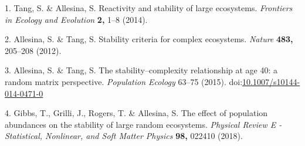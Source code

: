 \documentclass[]{article}
\begin{document}
\hypertarget{refs}{}
\leavevmode\hypertarget{ref-Tang2014b}{}%
1. Tang, S. \& Allesina, S. Reactivity and stability of large
ecosystems. \emph{Frontiers in Ecology and Evolution} \textbf{2,} 1--8
(2014).

\leavevmode\hypertarget{ref-Allesina2012}{}%
2. Allesina, S. \& Tang, S. Stability criteria for complex ecosystems.
\emph{Nature} \textbf{483,} 205--208 (2012).

\leavevmode\hypertarget{ref-Allesina2015a}{}%
3. Allesina, S. \& Tang, S. The stability--complexity relationship at
age 40: a random matrix perspective. \emph{Population Ecology} 63--75
(2015).
doi:\href{https://doi.org/10.1007/s10144-014-0471-0}{10.1007/s10144-014-0471-0}

\leavevmode\hypertarget{ref-Gibbs2017}{}%
4. Gibbs, T., Grilli, J., Rogers, T. \& Allesina, S. The effect of
population abundances on the stability of large random ecosystems.
\emph{Physical Review E - Statistical, Nonlinear, and Soft Matter
Physics} \textbf{98,} 022410 (2018).
\end{document}
